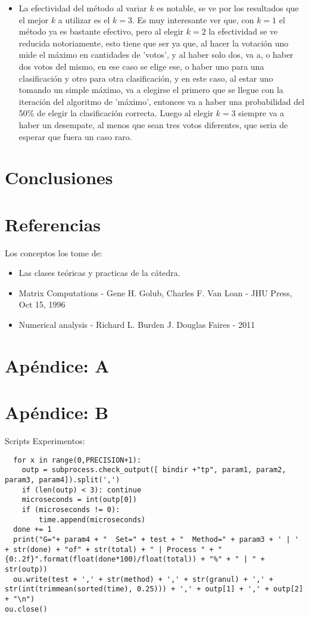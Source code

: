 \documentclass[a4paper]{article}
\begin{document}
\begin{itemize}
\item La efectividad del método al variar $k$ es notable, se ve por los resultados que el mejor $k$ a utilizar es el $k = 3$. Es muy interesante ver que, con $k = 1$ el método ya es bastante efectivo, pero al elegir $k = 2$ la efectividad se ve reducida notoriamente, esto tiene que ser ya que, al hacer la votación uno mide el máximo en cantidades de 'votos', y al haber solo dos, va a, o haber dos votos del mismo, en ese caso se elige ese, o haber uno para una clasificación y otro para otra clasificación, y en este caso, al estar uno tomando un simple máximo, va a elegirse el primero que se llegue con la iteración del algoritmo de 'máximo', entonces va a haber una probabilidad del 50\% de elegir la clasificación correcta. Luego al elegir $k = 3$ siempre va a haber un desempate, al menos que sean tres votos diferentes, que seria de esperar que fuera un caso raro.
\end{itemize}
\section{Conclusiones}


\section{Referencias}
Los conceptos los tome de:
\begin{itemize}
\item Las clases teóricas y practicas de la cátedra.
\item Matrix Computations - Gene H. Golub, Charles F. Van Loan - JHU Press, Oct 15, 1996
\item Numerical analysis - Richard L. Burden J. Douglas Faires - 2011
\end{itemize}
\section{Apéndice: A}
\begin{center}


\end{center}
\newpage
\section{Apéndice: B}

Scripts Experimentos:
\begin{lstlisting}
  for x in range(0,PRECISION+1):
    outp = subprocess.check_output([ bindir +"tp", param1, param2, param3, param4]).split(',')
    if (len(outp) < 3): continue
    microseconds = int(outp[0])
    if (microseconds != 0):
        time.append(microseconds)
  done += 1
  print("G="+ param4 + "  Set=" + test + "  Method=" + param3 + ' | ' + str(done) + "of" + str(total) + " | Process " + "{0:.2f}".format(float(done*100)/float(total)) + "%" + " | " + str(outp))
  ou.write(test + ',' + str(method) + ',' + str(granul) + ',' + str(int(trimmean(sorted(time), 0.25))) + ',' + outp[1] + ',' + outp[2] + "\n")
ou.close()
\end{lstlisting}
\end{document}

